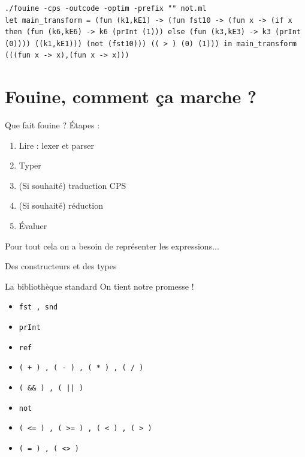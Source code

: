 \documentclass{beamer}
\newcommand{\tocpage}{
  \begin{frame}
    \tableofcontents[currentsection]
  \end{frame}
}
\begin{document}
\begin{frame}[fragile]
  \begin{verbatim}
./fouine -cps -outcode -optim -prefix "" not.ml 
let main_transform = (fun (k1,kE1) -> (fun fst10 -> (fun x -> (if x then (fun (k6,kE6) -> k6 (prInt (1))) else (fun (k3,kE3) -> k3 (prInt (0)))) ((k1,kE1))) (not (fst10))) (( > ) (0) (1))) in main_transform (((fun x -> x),(fun x -> x)))
  \end{verbatim}
  
\end{frame}

\section{Fouine, comment ça marche ?}

\tocpage

\begin{frame}{Que fait fouine ?}
  Étapes :
  \begin{enumerate}
  \item Lire : lexer et parser
  \item Typer
  \item (Si souhaité) traduction CPS
  \item (Si souhaité) réduction
  \item Évaluer
  \end{enumerate}

  Pour tout cela on a besoin de représenter les expressions...
\end{frame}

\begin{frame}{Des constructeurs et des types}
  
\end{frame}



\begin{frame}{La bibliothèque standard}
  On tient notre promesse !

  \begin{itemize}
  \item \texttt{fst , snd}
  \item \texttt{prInt}
  \item \texttt{ref}
  \item \texttt{( + ) , ( - ) , ( * ) , ( / )}
  \item \texttt{( \&\& ) ,  ( || )}
  \item \texttt{not}
  \item \texttt{( <= ) , ( >= ) , ( < ) , ( > )}
  \item \texttt{( = ) , ( <> )}
  \end{itemize}
\end{frame}
\end{document}
